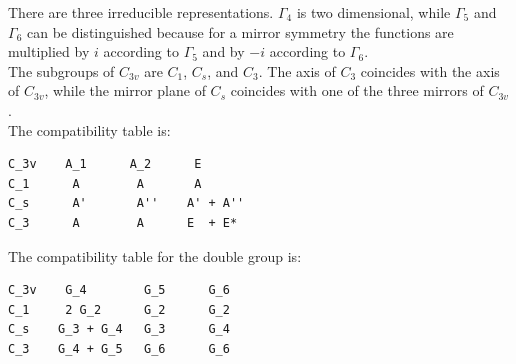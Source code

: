 \documentclass[12pt,a4paper]{article}
\begin{document}
There are three irreducible representations. $\Gamma_4$ is two dimensional, while
$\Gamma_5$ and $\Gamma_6$ can be distinguished because for a mirror symmetry the
functions are multiplied by $i$ according to $\Gamma_5$ and by $-i$ according to
$\Gamma_6$. \\
The subgroups of $C_{3v}$ are $C_1$, $C_s$, and $C_3$. The axis of $C_3$ coincides
with the axis of $C_{3v}$, while the mirror plane of $C_s$ coincides with
one of the three mirrors of $C_{3v}$. \\
The compatibility table is:
\begin{verbatim}
C_3v    A_1      A_2      E
C_1      A        A       A
C_s      A'       A''    A' + A''
C_3      A        A      E  + E*
\end{verbatim}
The compatibility table for the double group is:
\begin{verbatim}
C_3v    G_4        G_5      G_6
C_1     2 G_2      G_2      G_2
C_s    G_3 + G_4   G_3      G_4
C_3    G_4 + G_5   G_6      G_6
\end{verbatim}

\newpage
\end{document}
